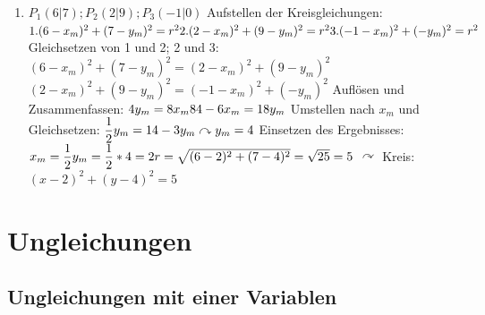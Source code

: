 \begin{enumerate}
		\item $P_1(6|7); P_2(2|9); P_3(-1|0)$ \newline \newline
		Aufstellen der Kreisgleichungen:\newline
		 $1. (6-x_m)^2 + (7-y_m)^2 = r^2\\
		 2.  (2-x_m)^2 + (9-y_m)^2 = r^2\\
		 3.  (-1-x_m)^2 + (-y_m)^2 = r^2$ \newline \newline
		Gleichsetzen von 1 und 2; 2 und 3: \newline
		$(6-x_m)^2 + (7-y_m)^2 = (2-x_m)^2 + (9-y_m)^2$ \newline
		$(2-x_m)^2 + (9-y_m)^2 = (-1-x_m)^2 + (-y_m)^2$ \newline \newline
		Aufl\"osen und Zusammenfassen: \newline
		$4y_m= 8x_m\\
		84-6x_m = 18y_m$ \newline \newline
		Umstellen nach $x_m$ und Gleichsetzen: \newline
		$\dfrac{1}{2}y_m = 14- 3y_m\\
		\curvearrowright y_m = 4$ \newline \newline
		Einsetzen des Ergebnisses: \newline
		$ x_m = \dfrac{1}{2}y_m = \dfrac{1}{2}* 4 = 2\\
		r=\sqrt{(6-2)^2 + (7-4)^2} = \sqrt{25} = 5$ \newline \newline
		$\curvearrowright$ Kreis: $(x-2)^2 + (y-4)^2 = 5$
		


\end{enumerate}
\section{Ungleichungen}

\subsection{Ungleichungen mit einer Variablen}


